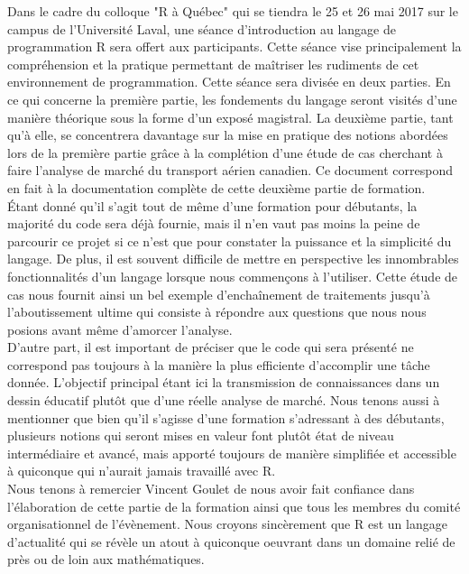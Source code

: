 Dans le cadre du colloque "R à Québec" qui se tiendra le 25 et 26 mai 2017 sur le campus de l'Université Laval, une séance d'introduction au langage de programmation R sera offert aux participants. Cette séance vise principalement la compréhension et la pratique permettant de maîtriser les rudiments de cet environnement de programmation. \cite{RQC2017} Cette séance sera divisée en deux parties. En ce qui concerne la première partie, les fondements du langage seront visités d'une manière théorique sous la forme d'un exposé magistral. La deuxième partie, tant qu'à elle, se concentrera davantage sur la mise en pratique des notions abordées lors de la première partie grâce à la complétion d'une étude de cas cherchant à faire l'analyse de marché du transport aérien canadien. Ce document correspond en fait à la documentation complète de cette deuxième partie de formation. \\

\noindent
Étant donné qu'il s'agit tout de même d'une formation pour débutants, la majorité du code sera déjà fournie, mais il n'en vaut pas moins la peine de parcourir ce projet si ce n'est que pour constater la puissance et la simplicité du langage. De plus, il est souvent difficile de mettre en perspective les innombrables fonctionnalités d'un langage lorsque nous commençons à l'utiliser. Cette étude de cas nous fournit ainsi un bel exemple d'enchaînement de traitements jusqu'à l'aboutissement ultime qui consiste à répondre aux questions que nous nous posions avant même d'amorcer l'analyse. \\

\noindent
D'autre part, il est important de préciser que le code qui sera présenté ne correspond pas toujours à la manière la plus efficiente d'accomplir une tâche donnée. L'objectif principal étant ici la transmission de connaissances dans un dessin éducatif plutôt que d'une réelle analyse de marché. Nous tenons aussi à mentionner que bien qu'il s'agisse d'une formation s'adressant à des débutants, plusieurs notions qui seront mises en valeur font plutôt état de niveau intermédiaire et avancé, mais apporté toujours de manière simplifiée et accessible à quiconque qui n'aurait jamais travaillé avec R. \\


Nous tenons à remercier Vincent Goulet de nous avoir fait confiance dans l'élaboration de cette partie de la formation ainsi que tous les membres du comité organisationnel de l'évènement. Nous croyons sincèrement que R est un langage d'actualité qui se révèle un atout à quiconque oeuvrant dans un domaine relié de près ou de loin aux mathématiques.